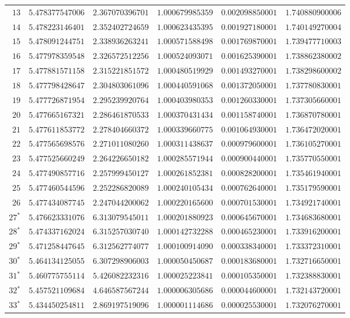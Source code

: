 {\begin{longtable}{@{}rrrrrr@{}}
$13$ & $5.478377547006$ & $2.367070396701$ & $1.000679985359$ & $0.002098850001$ & $1.740880900006$\\
$14$ & $5.478223146401$ & $2.352402724659$ & $1.000623435395$ & $0.001927180001$ & $1.740149270004$\\
$15$ & $5.478091244751$ & $2.338936263241$ & $1.000571588498$ & $0.001769870001$ & $1.739477710003$\\
$16$ & $5.477978359548$ & $2.326572512256$ & $1.000524093071$ & $0.001625390001$ & $1.738862380002$\\
$17$ & $5.477881571158$ & $2.315221851572$ & $1.000480519929$ & $0.001493270001$ & $1.738298600002$\\
$18$ & $5.477798428647$ & $2.304803061096$ & $1.000440591068$ & $0.001372050001$ & $1.737780830001$\\
$19$ & $5.477726871954$ & $2.295239920764$ & $1.000403980353$ & $0.001260330001$ & $1.737305660001$\\
$20$ & $5.477665167321$ & $2.286461870533$ & $1.000370431434$ & $0.001158740001$ & $1.736870780001$\\
$21$ & $5.477611853772$ & $2.278404660372$ & $1.000339660775$ & $0.001064930001$ & $1.736472020001$\\
$22$ & $5.477565698576$ & $2.271011080260$ & $1.000311438637$ & $0.000979600001$ & $1.736105270001$\\
$23$ & $5.477525660249$ & $2.264226650182$ & $1.000285571944$ & $0.000900440001$ & $1.735770550001$\\
$24$ & $5.477490857716$ & $2.257999450127$ & $1.000261852381$ & $0.000828200001$ & $1.735461940001$\\
$25$ & $5.477460544596$ & $2.252286820089$ & $1.000240105434$ & $0.000762640001$ & $1.735179590001$\\
$26$ & $5.477434087745$ & $2.247044200062$ & $1.000220165600$ & $0.000701530001$ & $1.734921740001$\\
$27$$^\ast$ & $5.476623331076$ & $6.313079545011$ & $1.000201880923$ & $0.000645670001$ & $1.734683680001$\\
$28$$^\ast$ & $5.474337162024$ & $6.315257030740$ & $1.000142732288$ & $0.000465230001$ & $1.733916200001$\\
$29$$^\ast$ & $5.471258447645$ & $6.312562774077$ & $1.000100914090$ & $0.000338340001$ & $1.733372310001$\\
$30$$^\ast$ & $5.464134125055$ & $6.307298906003$ & $1.000050450687$ & $0.000183680001$ & $1.732716650001$\\
$31$$^\ast$ & $5.460775755114$ & $5.426082232316$ & $1.000025223841$ & $0.000105350001$ & $1.732388830001$\\
$32$$^\ast$ & $5.457521109684$ & $4.646587567244$ & $1.000006305686$ & $0.000044600001$ & $1.732143720001$\\
$33$$^\ast$ & $5.434450254811$ & $2.869197519096$ & $1.000001114686$ & $0.000025530001$ & $1.732076270001$\\
\end{longtable}
}

